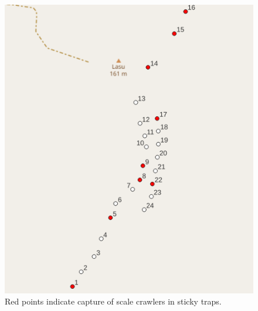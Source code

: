 \documentclass[12pt,letterpaper,english,bibliography=totocnumbered, abstract=on]{scrartcl}
\begin{document}
\begin{figure}[p]
	\centering
	\includegraphics[width=\linewidth]{../sticky_traps/crawlers}
	\caption{Red points indicate capture of scale crawlers in sticky traps.}
	\label{fig:crawlers}
\end{figure}
\end{document}
